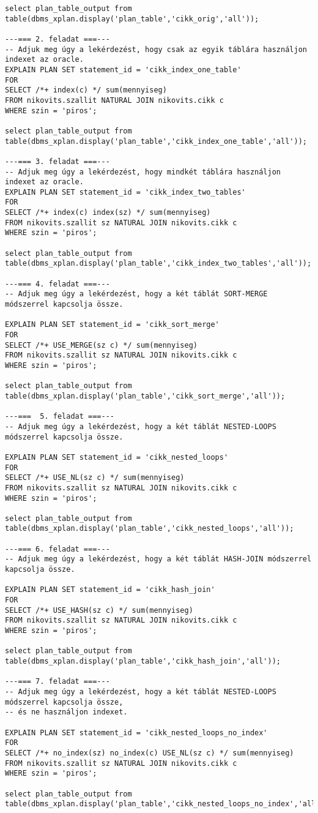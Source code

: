 \documentclass[a4paper,11.5pt, table]{article}
\begin{document}
\begin{lstlisting}
select plan_table_output from table(dbms_xplan.display('plan_table','cikk_orig','all'));

---=== 2. feladat ===---
-- Adjuk meg úgy a lekérdezést, hogy csak az egyik táblára használjon indexet az oracle. 
EXPLAIN PLAN SET statement_id = 'cikk_index_one_table'
FOR
SELECT /*+ index(c) */ sum(mennyiseg)
FROM nikovits.szallit NATURAL JOIN nikovits.cikk c
WHERE szin = 'piros';

select plan_table_output from table(dbms_xplan.display('plan_table','cikk_index_one_table','all'));

---=== 3. feladat ===---
-- Adjuk meg úgy a lekérdezést, hogy mindkét táblára használjon indexet az oracle.
EXPLAIN PLAN SET statement_id = 'cikk_index_two_tables'
FOR
SELECT /*+ index(c) index(sz) */ sum(mennyiseg)
FROM nikovits.szallit sz NATURAL JOIN nikovits.cikk c
WHERE szin = 'piros';

select plan_table_output from table(dbms_xplan.display('plan_table','cikk_index_two_tables','all'));

---=== 4. feladat ===---
-- Adjuk meg úgy a lekérdezést, hogy a két táblát SORT-MERGE módszerrel kapcsolja össze.

EXPLAIN PLAN SET statement_id = 'cikk_sort_merge'
FOR
SELECT /*+ USE_MERGE(sz c) */ sum(mennyiseg)
FROM nikovits.szallit sz NATURAL JOIN nikovits.cikk c
WHERE szin = 'piros';

select plan_table_output from table(dbms_xplan.display('plan_table','cikk_sort_merge','all'));

---===  5. feladat ===---
-- Adjuk meg úgy a lekérdezést, hogy a két táblát NESTED-LOOPS módszerrel kapcsolja össze. 

EXPLAIN PLAN SET statement_id = 'cikk_nested_loops'
FOR
SELECT /*+ USE_NL(sz c) */ sum(mennyiseg)
FROM nikovits.szallit sz NATURAL JOIN nikovits.cikk c
WHERE szin = 'piros';

select plan_table_output from table(dbms_xplan.display('plan_table','cikk_nested_loops','all'));

---=== 6. feladat ===---
-- Adjuk meg úgy a lekérdezést, hogy a két táblát HASH-JOIN módszerrel kapcsolja össze.

EXPLAIN PLAN SET statement_id = 'cikk_hash_join'
FOR
SELECT /*+ USE_HASH(sz c) */ sum(mennyiseg)
FROM nikovits.szallit sz NATURAL JOIN nikovits.cikk c
WHERE szin = 'piros';

select plan_table_output from table(dbms_xplan.display('plan_table','cikk_hash_join','all'));

---=== 7. feladat ===---
-- Adjuk meg úgy a lekérdezést, hogy a két táblát NESTED-LOOPS módszerrel kapcsolja össze,
-- és ne használjon indexet. 

EXPLAIN PLAN SET statement_id = 'cikk_nested_loops_no_index'
FOR
SELECT /*+ no_index(sz) no_index(c) USE_NL(sz c) */ sum(mennyiseg)
FROM nikovits.szallit sz NATURAL JOIN nikovits.cikk c
WHERE szin = 'piros';

select plan_table_output from table(dbms_xplan.display('plan_table','cikk_nested_loops_no_index','all'));

\end{lstlisting}
\end{document}
